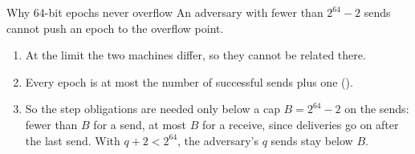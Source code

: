 \begin{frame}[t]{Why 64-bit epochs never overflow}
  \vspace{0.3em}
  \footnotesize
  An adversary with fewer than $2^{64} - 2$ sends cannot push an epoch to the overflow point.
  \vspace{3.2em}

  \centering
  \vspace{0.8em}

  \raggedright
  \begin{enumerate}\footnotesize
    \item At the limit the two machines differ, so they cannot be related there.
    \item Every epoch is at most the number of successful sends plus one
      ().
    \item So the step obligations are needed only below a cap $B = 2^{64} - 2$ on the sends: fewer
      than $B$ for a send, at most $B$ for a receive, since deliveries go on after the last send.
      With $q + 2 < 2^{64}$, the adversary's $q$ sends stay below $B$.
  \end{enumerate}
\end{frame}

